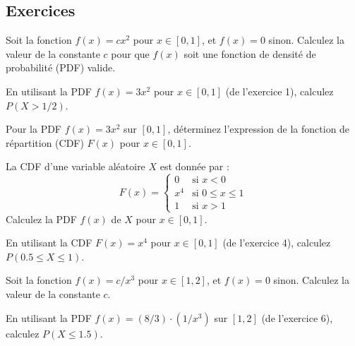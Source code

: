 \subsection{Exercices}


\begin{exercicebox}
Soit la fonction $f(x) = cx^2$ pour $x \in [0, 1]$, et $f(x)=0$ sinon.
Calculez la valeur de la constante $c$ pour que $f(x)$ soit une fonction de densité de probabilité (PDF) valide.
\end{exercicebox}

\begin{exercicebox}
En utilisant la PDF $f(x) = 3x^2$ pour $x \in [0, 1]$ (de l'exercice 1), calculez $P(X > 1/2)$.
\end{exercicebox}

\begin{exercicebox}
Pour la PDF $f(x) = 3x^2$ sur $[0, 1]$, déterminez l'expression de la fonction de répartition (CDF) $F(x)$ pour $x \in [0, 1]$.
\end{exercicebox}

\begin{exercicebox}
La CDF d'une variable aléatoire $X$ est donnée par :
$$F(x) = \begin{cases} 0 & \text{si } x < 0 \\ x^4 & \text{si } 0 \le x \le 1 \\ 1 & \text{si } x > 1 \end{cases}$$
Calculez la PDF $f(x)$ de $X$ pour $x \in [0, 1]$.
\end{exercicebox}

\begin{exercicebox}
En utilisant la CDF $F(x) = x^4$ pour $x \in [0, 1]$ (de l'exercice 4), calculez $P(0.5 \le X \le 1)$.
\end{exercicebox}

\begin{exercicebox}
Soit la fonction $f(x) = c/x^3$ pour $x \in [1, 2]$, et $f(x)=0$ sinon.
Calculez la valeur de la constante $c$.
\end{exercicebox}

\begin{exercicebox}
En utilisant la PDF $f(x) = (8/3) \cdot (1/x^3)$ sur $[1, 2]$ (de l'exercice 6), calculez $P(X \le 1.5)$.
\end{exercicebox}

